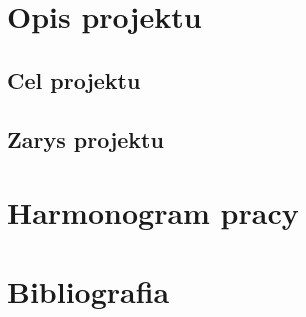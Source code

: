 

\usepackage{url}

                   

\chapter{Opis projektu}
\section{Cel projektu}
  

\section{Zarys projektu}
  

\chapter{Harmonogram pracy}
	

\chapter{Bibliografia}
	









